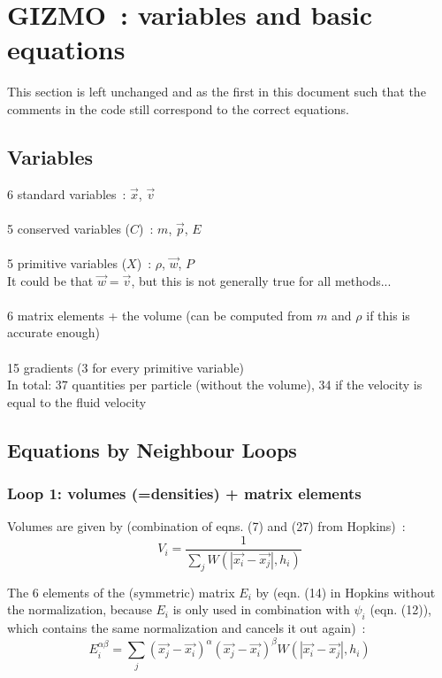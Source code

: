 
\section{GIZMO~: variables and basic equations}

This section is left unchanged and as the first in this document such that the comments in the code still correspond to the correct equations.


\subsection{Variables}
6 standard variables~: $\vec{x}$, $\vec{v}$\\  \\
5 conserved variables ($C$)~: $m$, $\vec{p}$, $E$\\ \\
5 primitive variables ($X$)~: $\rho$, $\vec{w}$, $P$\\
It could be that $\vec{w} = \vec{v}$, but this is not generally true for all methods...\\ \\
6 matrix elements + the volume (can be computed from $m$ and $\rho$ if this is
accurate enough)\\ \\
15 gradients (3 for every primitive variable)\\

In total: 37 quantities per particle (without the volume), 34 if the velocity is equal to the fluid velocity

\subsection{Equations by Neighbour Loops}

\subsubsection{Loop 1: volumes (=densities) + matrix elements}
Volumes are given by (combination of eqns. (7) and (27) from Hopkins)~:
\begin{equation}
V_i = \frac{1}{\sum_j W(|\vec{x_i}-\vec{x_j}|, h_i)}
\end{equation}

The 6 elements of the (symmetric) matrix $E_i$ by (eqn. (14) in Hopkins without the normalization, because $E_i$ is only used in combination with $\psi_i$ (eqn. (12)), which contains the same normalization and cancels it out again)~:
\begin{equation}
E_i^{\alpha \beta} = \sum_j (\vec{x_j}-\vec{x_i})^\alpha (\vec{x_j}-\vec{x_i})^\beta W(|\vec{x_i}-\vec{x_j}|, h_i)
\end{equation}

